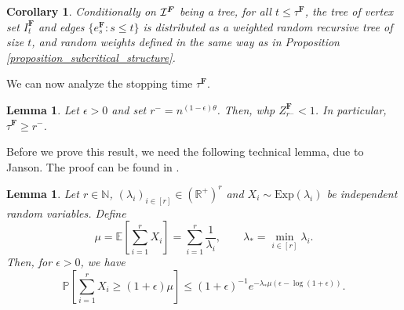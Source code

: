 \documentclass[11pt]{article}
\numberwithin{equation}{section}
\newtheorem{corollary}[theorem]{Corollary}
\newtheorem{lemma}[theorem]{Lemma}
\theoremstyle{definition}
\newcommand\cI{{\cal{I}}}
\begin{document}
\begin{corollary}
Conditionally on $\cI^{\boldsymbol{F}}$ being a tree, for all $t\leq \tau^{\boldsymbol{F}}$, the tree of vertex set $I_t^{\boldsymbol{F}}$ and edges $\{e^{\boldsymbol{F}}_s: s\leq t\}$ is distributed as a weighted random recursive tree of size $t$, and random weights defined in the same way as in Proposition \ref{proposition_subcritical_structure}.
\end{corollary}

We can now analyze the stopping time $\tau^{\boldsymbol{F}}$.

\begin{lemma}\label{concentration_labels}
Let $\epsilon > 0$ and set $r^- = n^{(1-\epsilon)\theta}$. Then, whp $Z^{\boldsymbol{F}}_{r^-} < 1$. In particular, $\tau^{\boldsymbol{F}} \geq r^-$. \end{lemma}

Before we prove this result, we need the following technical lemma, due to Janson. The proof can be found in \cite{J18}.

\begin{lemma}
\label{janson1}
Let $r \in \mathbb{N}$, $(\lambda_i)_{i\in [r]} \in (\mathbb{R}^+)^r$ and $X_i \sim \mathrm{Exp}(\lambda_i)$ be independent random variables. Define
$$ \mu = \mathbb{E}\left[ \sum_{i=1}^r X_i \right] = \sum_{i=1}^r \frac{1}{\lambda_i}, \quad \quad \lambda_* = \min_{i \in [r]} \lambda_i. $$
Then, for $\epsilon >0$, we have 
$$ \mathbb{P}\left[ \sum_{i=1}^r X_i \geq (1+\epsilon)\mu \right] \leq (1+\epsilon)^{-1} e^{-\lambda_* \mu (\epsilon-\log(1+\epsilon))}.$$
\end{lemma}
\end{document}
